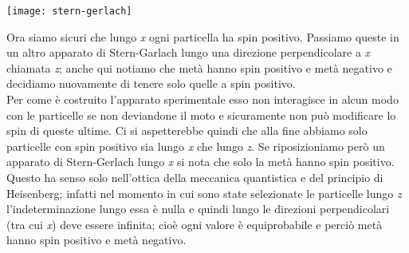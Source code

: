 \begin{center}
\texttt{[image: stern-gerlach]}
\end{center}
Ora siamo sicuri che lungo \textit{x} ogni particella ha spin positivo. Passiamo queste in un altro apparato di  Stern-Garlach lungo una direzione perpendicolare a \textit{x} chiamata \textit{z}; anche qui notiamo che metà hanno spin positivo e metà negativo e decidiamo nuovamente di tenere solo quelle a spin positivo.\\
Per come è costruito l'apparato sperimentale esso non interagisce in alcun modo con le particelle se non deviandone il moto e sicuramente non può modificare lo spin di queste ultime. Ci si aspetterebbe quindi che alla fine abbiamo solo particelle con spin positivo sia lungo \textit{x} che lungo \textit{z}. Se riposizioniamo però un apparato di Stern-Gerlach lungo \textit{x} si nota che solo la metà hanno spin positivo.\\
Questo ha senso solo nell'ottica della meccanica quantistica e del principio di Heisenberg; infatti nel momento in cui sono state selezionate le particelle lungo \textit{z} l'indeterminazione lungo essa è nulla e quindi lungo le direzioni perpendicolari (tra cui \textit{x}) deve essere infinita; cioè ogni valore è equiprobabile e perciò metà hanno spin positivo e metà negativo.
